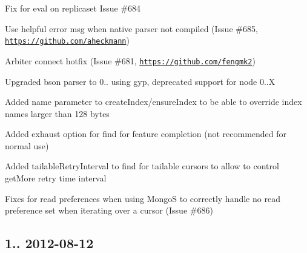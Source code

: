 \begin{DoxyItemize}
\item Fix for eval on replicaset Issue \#684
\item Use helpful error msg when native parser not compiled (Issue \#685, \href{https://github.com/aheckmann}{\tt https\+://github.\+com/aheckmann})
\item Arbiter connect hotfix (Issue \#681, \href{https://github.com/fengmk2}{\tt https\+://github.\+com/fengmk2})
\item Upgraded bson parser to 0.. using gyp, deprecated support for node 0..\+X
\item Added name parameter to create\+Index/ensure\+Index to be able to override index names larger than 128 bytes
\item Added exhaust option for find for feature completion (not recommended for normal use)
\item Added tailable\+Retry\+Interval to find for tailable cursors to allow to control get\+More retry time interval
\item Fixes for read preferences when using MongoS to correctly handle no read preference set when iterating over a cursor (Issue \#686)
\end{DoxyItemize}

\subsection*{1.. 2012-\/08-\/12 }


